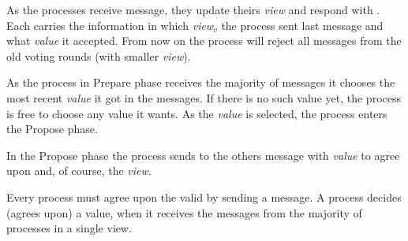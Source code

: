 As the processes receive \prepare message, they update theirs \textit{view} and respond with \prepareOK[]. Each \prepareOK carries the information in which \textit{view}$_v$ the process sent last \accept message and what \textit{value} it accepted. From now on the process will reject all messages from the old voting rounds (with smaller \textit{view}).

As the process in Prepare phase receives the majority of \prepareOK messages it chooses the most recent \textit{value} it got in the messages. If there is no such value yet, the process is free to choose any value it wants. As the \textit{value} is selected, the process enters the Propose phase.

In the Propose phase the process sends to the others \propose message with \textit{value} to agree upon and, of course, the \textit{view}.

Every process must agree upon the valid \propose by sending a \accept message.
A process decides (agrees upon) a value, when it receives the \accept messages from the majority of processes in a single view.


